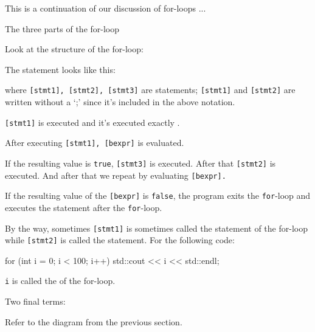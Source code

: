 \newpage{}

This is a continuation of our discussion of for-loops ...

The three parts of the for-loop

Look at the structure of the for-loop:

The statement looks like this:
\begin{center}
\tab[1em]{\EMPHASIZE{\texttt{[stmt3]}}}
\end{center}
where \texttt{[stmt1], [stmt2], [stmt3]} are statements; \texttt{[stmt1]} and \texttt{[stmt2]} are written without a `;' since it's included in the above notation.

\texttt{[stmt1]} is executed  and it's executed exactly .

After executing \texttt{[stmt1], [bexpr]} is evaluated.

If the resulting value is \texttt{true}, \texttt{[stmt3]} is executed.
After that \texttt{[stmt2]} is executed. And after that we repeat by
evaluating \texttt{[bexpr].}

If the resulting value of the \texttt{[bexpr]} is \texttt{false}, the
program exits the \texttt{for}-loop and executes the statement after the
\texttt{for}-loop.

By the way, sometimes \texttt{[stmt1]} is sometimes called the  statement of the for-loop while \texttt{[stmt2]} is called the  statement. For the following code:
\begin{console}
for (int i = 0; i < 100; i++)
{   
    std::cout << i << std::endl;
}
\end{console}
\texttt{i} is called the  of the
for-loop.

Two final terms:

\newpage{}

Refer to the diagram from the previous section.

